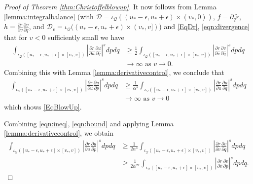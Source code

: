 \documentclass{article}
\newcommand{\Q}{\mathcal{Q}}
\begin{document}
\begin{proof}[Proof of Theorem \ref{thm:Christoffelblowup}]
It now follows from Lemma \ref{lemma:integralbalance} (with $\mathcal{D} = \iota_{\Q}((u_*-\epsilon,u_*+\epsilon)\times(v_*,0))$, $f=\partial_q\tilde{r}$, $h=\frac{\partial r}{\partial v}\frac{\partial v}{\partial q}$, and $\mathcal{D}_v = \iota_{\Q}((u_*-\epsilon,u_*+\epsilon)\times(v_*,v])$) and \eqref{EqDr}, \eqref{eqn:divergence} that for $v<0$ sufficiently small we have
    \begin{align}
 \int_{\iota_{\Q}([u_*-\epsilon,u_*+\epsilon]\times[v_*,v])}\left|\frac{\partial r}{\partial u}\frac{\partial u}{\partial q}\right|^{s}dpdq&\geq \frac{1}{2}\int_{\iota_{\Q}([u_*-\epsilon,u_*+\epsilon]\times[v_*,v])}\left|\frac{\partial r}{\partial v}\frac{\partial v}{\partial q}\right|^{s}dpdq\label{eqn:ineq}\\
    &\to\infty\text{ as }v\to0.\label{eqn:notL2}
\end{align}
Combining this with Lemma \ref{lemma:derivativecontrol}, we conclude that
\begin{align}
    \int_{\iota_{\Q}([u_*-\epsilon,u_*+\epsilon]\times[v_*,v])}\left|\frac{\partial r}{\partial u}\frac{\partial u}{\partial p}\right|^{s}dpdq&\geq \frac{1}{\alpha^{s}} \int_{\iota_{\Q}([u_*-\epsilon,u_*+\epsilon]\times[v_*,v])}\left|\frac{\partial r}{\partial u}\frac{\partial u}{\partial q}\right|^{s}dpdq\label{eqn:bound}\\
    &\to\infty\text{ as }v\to0\label{eqn:ineq1}
\end{align}
which shows \eqref{EqBlowUp}.

Combining \eqref{eqn:ineq}, \eqref{eqn:bound} and applying Lemma \ref{lemma:derivativecontrol}, we obtain
\begin{align}
         \int_{\iota_{\Q}([u_*-\epsilon,u_*+\epsilon]\times[v_*,v])}\left|\frac{\partial r}{\partial u}\frac{\partial u}{\partial p}\right|^{s}dpdq&\geq\frac{1}{2\alpha^{s}} \int_{\iota_{\Q}([u_*-\epsilon,u_*+\epsilon]\times[v_*,v])}\left|\frac{\partial r}{\partial v}\frac{\partial v}{\partial q}\right|^{s}dpdq\\
         &\geq\frac{1}{2\alpha^{2s}} \int_{\iota_{\Q}([u_*-\epsilon,u_*+\epsilon]\times[v_*,v])}\left|\frac{\partial r}{\partial v}\frac{\partial v}{\partial p}\right|^{s}dpdq.\label{eqn:ineq2}
\end{align}


\end{proof}
\end{document}
